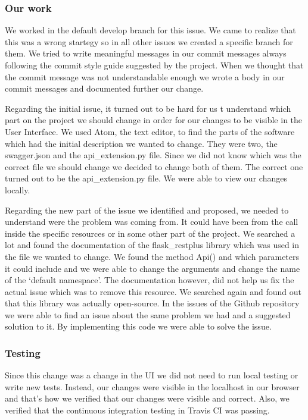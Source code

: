 \documentclass{article}
\begin{document}
\subsubsection{Our work}

\hspace{0.5cm}We worked in the default develop branch for this issue. We came to realize that this was a wrong startegy so in all other issues we created a specific branch for them. We tried to write meaningful messages in our commit messages always following the commit style guide suggested by the project. When we thought that the commit message was not understandable enough we wrote a body in our commit messages and documented further our change.

Regarding the initial issue, it turned out to be hard for us t understand which part on the project we should change in order for our changes to be visible in the User Interface. We used Atom, the text editor, to find the parts of the software which had the initial description we wanted to change. They were two, the swagger.json and the api\_extension.py file. Since we did not know which was the correct file we should change we decided to change both of them. The correct one turned out to be the api\_extension.py file. We were able to view our changes locally.

Regarding the new part of the issue we identified and proposed, we needed to understand were the problem was coming from. It could have been from the call inside the specific resources or in some other part of the project. We searched a lot and found the documentation of the flask\_restplus library which was used in the file we wanted to change. We found the method Api() and which parameters it could include and we were able to change the arguments and change the name of the `default namespace'. The documentation however, did not help us fix the actual issue which was to remove this resource. We searched again and found out that this library was actually open-source. In the issues of the Github repository we were able to find an issue about the same problem we had and a suggested solution to it. By implementing this code we were able to solve the issue.
\subsubsection{Testing}
\hspace{0.5cm}Since this change was a change in the UI we did not need to run local testing or write new tests. Instead, our changes were visible in the localhost in our browser and that's how we verified that our changes were visible and correct. Also, we verified that the continuous integration testing in Travis CI was passing. 
\end{document}
